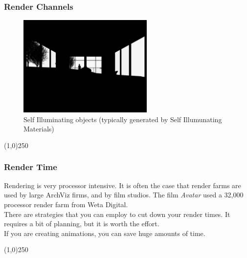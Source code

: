 \begin{frame}
\frametitle{Render Channels}
\begin{figure}
	\centering
	\includegraphics[height=5cm]{./img/Rendering/SittingRoomFinalSelf_Illumination.png}
	\caption[Self Illuminating objects (typically generated by Self Illumunating Materials)]{Self Illuminating objects (typically generated by Self Illumunating Materials)}
	\label{fig:sittingroomfinalSelfIllumination}
\end{figure}
\end{frame}
\begin{center}\line(1,0){250}\end{center}







\begin{frame}
	\frametitle{Render Time}
	Rendering is very processor intensive.  It is often the case that render farms are used by large ArchViz firms, and by film studios.  The film \textit{Avatar} used a 32,000 processor render farm from Weta Digital.\\
	There are strategies that you can employ to cut down your render times.  It requires a bit of planning, but it is worth the effort.\\
	If you are creating animations, you can save huge amounts of time.
	
\end{frame}
\begin{center}\line(1,0){250}\end{center}


